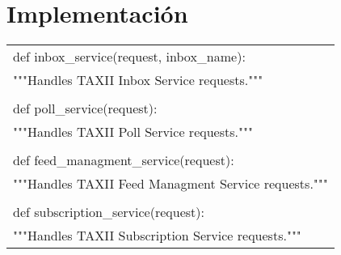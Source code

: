 \section{Implementación}
	
	\begin{center}
		\begin{tabular}{|l|}
			\hline
			def inbox\_service(request, inbox\_name): \\
			"""Handles TAXII Inbox Service requests.""" \\ \\
			
			def poll\_service(request):\ \\
			"""Handles TAXII Poll Service requests.""" \\ \\
			
			def feed\_managment\_service(request): \\
			"""Handles TAXII Feed Managment Service requests.""" \\ \\
			
			def subscription\_service(request):\ \\
			"""Handles TAXII Subscription Service requests.""" \\
			\hline
		\end{tabular}
	\end{center}\ \\
	
